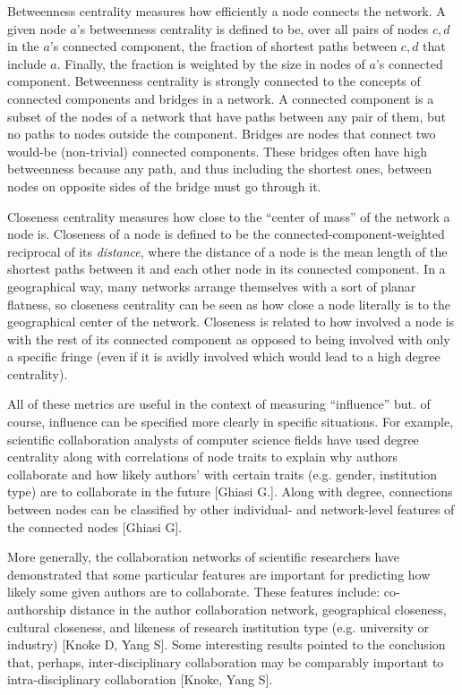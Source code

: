 \documentclass{article}
\begin{document}
Betweenness centrality measures how efficiently a node connects the network.
A given node $a$'s betweenness centrality is defined to be, over all pairs of nodes $c, d$ in the $a$'s connected component, the fraction of shortest paths between $c, d$ that include $a$.
Finally, the fraction is weighted by the size in nodes of $a$'s connected component.
Betweenness centrality is strongly connected to the concepts of connected components and bridges in a network. A connected component is a subset of the nodes of a network that have paths between any pair of them, but no paths to nodes outside the component.
Bridges are nodes that connect two would-be (non-trivial) connected components.
These bridges often have high betweenness because any path, and thus including the shortest ones, between nodes on opposite sides of the bridge must go through it.

Closeness centrality measures how close to the ``center of mass'' of the network a node is.
Closeness of a node is defined to be the connected-component-weighted reciprocal of its \textit{distance}, where the distance of a node is the mean length of the shortest paths between it and each other node in its connected component.
In a geographical way, many networks arrange themselves with a sort of planar flatness, so closeness centrality can be seen as how close a node literally is to the geographical center of the network.
Closeness is related to how involved a node is with the rest of its connected component as opposed to being involved with only a specific fringe (even if it is avidly involved which would lead to a high degree centrality).

All of these metrics are useful in the context of measuring ``influence'' but. of course, influence can be specified more clearly in specific situations.
For example, scientific collaboration analysts of computer science fields have used degree centrality along with correlations of node traits to explain why authors collaborate and how likely authors' with certain traits (e.g. gender, institution type) are to collaborate in the future [Ghiasi G.].
Along with degree, connections between nodes can be classified by other individual- and network-level features of the connected nodes [Ghiasi G].

More generally, the collaboration networks of scientific researchers have demonstrated that some particular features are important for predicting how likely some given authors are to collaborate. These features include: co-authorship distance in the author collaboration network, geographical closeness, cultural closeness, and likeness of research institution type (e.g. university or industry) [Knoke D, Yang S].
Some interesting results pointed to the conclusion that, perhaps, inter-disciplinary collaboration may be comparably important to intra-disciplinary collaboration [Knoke, Yang S].
\end{document}
